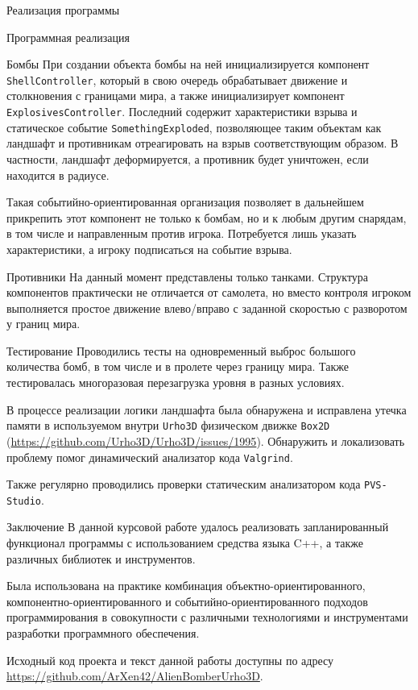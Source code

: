 \documentclass[a4paper, 14pt]{extarticle}
\numberwithin{equation}{section} %
\begin{document}
\begin{section}{Реализация программы}
\begin{subsection}{Программная реализация}
\begin{subsubsection}{Бомбы}
При создании объекта бомбы на ней инициализируется компонент \verb|ShellController|, который в свою очередь обрабатывает движение и столкновения с границами мира, а также инициализирует компонент \verb|ExplosivesController|.
Последний содержит характеристики взрыва и статическое событие \verb|SomethingExploded|, позволяющее таким объектам как ландшафт и противникам отреагировать на взрыв соответствующим образом.
В частности, ландшафт деформируется, а противник будет уничтожен, если находится в радиусе.

Такая событийно-ориентированная организация позволяет в дальнейшем прикрепить этот компонент не только к бомбам, но и к любым другим снарядам, в том числе и направленным против игрока.
Потребуется лишь указать характеристики, а игроку подписаться на событие взрыва.
\end{subsubsection}

\begin{subsubsection}{Противники}
На данный момент представлены только танками.
Структура компонентов практически не отличается от самолета, но вместо контроля игроком выполняется простое движение влево/вправо с заданной скоростью с разворотом у границ мира.
\end{subsubsection}
\end{subsection}

\begin{subsection}{Тестирование}
Проводились тесты на одновременный выброс большого количества бомб, в том числе и в пролете через границу мира.
Также тестировалась многоразовая перезагрузка уровня в разных условиях.

В процессе реализации логики ландшафта была обнаружена и исправлена утечка памяти в используемом внутри \verb|Urho3D| физическом движке \verb|Box2D| (\url{https://github.com/Urho3D/Urho3D/issues/1995}).
Обнаружить и локализовать проблему помог динамический анализатор кода \verb|Valgrind|.

Также регулярно проводились проверки статическим анализатором кода \verb|PVS-Studio|.
\end{subsection}

\end{section}

\begin{section}{Заключение}
В данной курсовой работе удалось реализовать запланированный функционал программы с использованием средства языка C++, а также различных библиотек и инструментов.

Была использована на практике комбинация объектно-ориентированного, компонентно-ориентированного и событийно-ориентированного подходов программирования в совокупности с различными технологиями и инструментами разработки программного обеспечения.

Исходный код проекта и текст данной работы доступны по адресу \url{https://github.com/ArXen42/AlienBomberUrho3D}.
\end{section}

~\nocite{urho3d-docs,cppreference, teplyakov}
\printbibliography[title = Список использованных источников]
\end{document}
